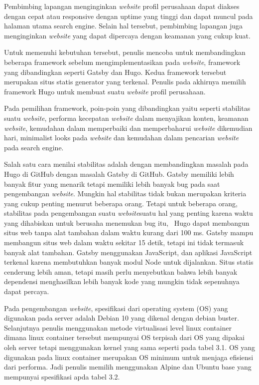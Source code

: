 Pembimbing lapangan menginginkan \emph{website} profil perusahaan dapat diakses dengan 
cepat atau responsive dengan uptime yang tinggi dan dapat muncul pada halaman utama search engine. 
Selain hal tersebut, pembimbing lapangan juga menginginkan \emph{website} yang dapat 
dipercaya dengan keamanan yang cukup kuat.

Untuk memenuhi kebutuhan tersebut, penulis mencoba untuk membandingkan beberapa framework sebelum 
mengimplementasikan pada \emph{website}, framework yang dibandingkan seperti Gatsby dan Hugo. Kedua framework 
tersebut merupakan situs statis generator yang terkenal. Penulis pada akhirnya memilih framework 
Hugo untuk membuat suatu \emph{website} profil perusahaan.

Pada pemilihan framework, poin-poin yang dibandingkan yaitu seperti stabilitas suatu \emph{website}, 
performa kecepatan \emph{website} dalam menyajikan konten, keamanan \emph{website}, kemudahan dalam memperbaiki dan 
memperbaharui \emph{website} dikemudian hari, minimalist looks pada \emph{website} dan 
kemudahan dalam pencarian \emph{website} pada search engine.
    
Salah satu cara menilai stabilitas adalah dengan membandingkan masalah pada Hugo di GitHub 
dengan masalah Gatsby di GitHub. Gatsby memiliki lebih banyak fitur yang menarik tetapi memiliki 
lebih banyak bug pada saat pengembangan \emph{website}. Mungkin hal stabilitas tidak bukan merupakan kriteria 
yang cukup penting menurut beberapa orang. Tetapi untuk beberapa orang, stabilitas 
pada pengembangan suatu \emph{website}suatu hal yang penting karena waktu yang dihabiskan 
untuk berusaha menemukan bug itu,~\cite{ref:freecodecamp}
Hugo dapat membangun situs web tanpa alat tambahan dalam waktu kurang dari 100 ms. 
Gatsby mampu membangun situs web dalam waktu sekitar 15 detik, tetapi ini tidak termasuk banyak alat tambahan. 
Gatsby menggunakan JavaScript, dan aplikasi JavaScript terkenal karena membutuhkan banyak modul Node untuk dijalankan. 
Situs statis cenderung lebih aman, tetapi masih perlu menyebutkan bahwa lebih banyak dependensi 
menghasilkan lebih banyak kode yang mungkin tidak sepenuhnya dapat percaya.~\cite{ref:freecodecamp}

Pada pengembangan \emph{website}, spesifikasi dari operating system (OS) 
yang digunakan pada server adalah Debian 10 yang dikenal dengan debian buster. 
Selanjutnya penulis menggunakan metode virtualisasi level linux container dimana 
linux container tersebut mempunyai OS terpisah dari OS yang dipakai oleh server tetapi 
menggunakan kernel yang sama seperti pada tabel 3.1. OS yang digunakan pada linux container 
merupakan OS minimum untuk menjaga efisiensi dari performa. Jadi penulis memilih menggunakan  
Alpine dan Ubuntu base yang mempunyai spesifikasi apda tabel 3.2.~\cite{thedocker}


